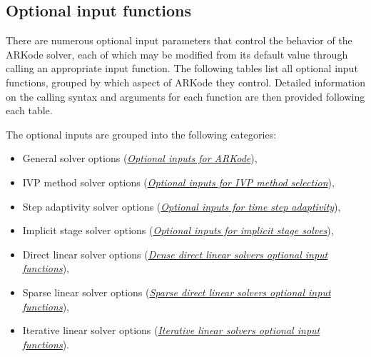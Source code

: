 \documentclass[letterpaper,10pt,english]{sphinxmanual}
\begin{document}
\subsection{Optional input functions}
\label{c_interface/User_callable:cinterface-optionalinputs}\label{c_interface/User_callable:optional-input-functions}
There are numerous optional input parameters that control the behavior
of the ARKode solver, each of which may be modified from its default
value through calling an appropriate input function.  The following
tables list all optional input functions, grouped by which aspect of
ARKode they control.  Detailed information on the calling syntax and
arguments for each function are then provided following each table.

The optional inputs are grouped into the following categories:
\begin{itemize}
\item {} 
General solver options ({\hyperref[c_interface/User_callable:cinterface-arkodeinputtable]{\emph{Optional inputs for ARKode}}}),

\item {} 
IVP method solver options ({\hyperref[c_interface/User_callable:cinterface-arkodemethodinputtable]{\emph{Optional inputs for IVP method selection}}}),

\item {} 
Step adaptivity solver options ({\hyperref[c_interface/User_callable:cinterface-arkodeadaptivityinputtable]{\emph{Optional inputs for time step adaptivity}}}),

\item {} 
Implicit stage solver options ({\hyperref[c_interface/User_callable:cinterface-cinterface-arkodesolverinputtable]{\emph{Optional inputs for implicit stage solves}}}),

\item {} 
Direct linear solver options ({\hyperref[c_interface/User_callable:cinterface-arkdlsinputs]{\emph{Dense direct linear solvers optional input functions}}}),

\item {} 
Sparse linear solver options ({\hyperref[c_interface/User_callable:cinterface-arkslsinputs]{\emph{Sparse direct linear solvers optional input functions}}}),

\item {} 
Iterative linear solver options ({\hyperref[c_interface/User_callable:cinterface-arkspilsinputs]{\emph{Iterative linear solvers optional input functions}}}).

\end{itemize}
\end{document}
